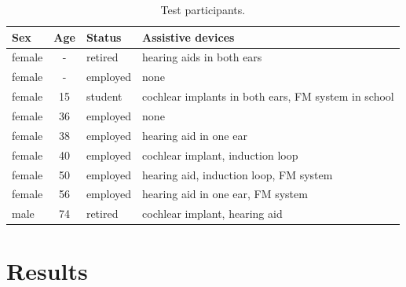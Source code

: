 \documentclass[english, 12pt, a4paper, pdftex, elec, utf8]{aaltothesis}
\begin{document}
\begin{table}[]
	\renewcommand{\arraystretch}{1.2}  %
	\setlength{\tabcolsep}{9pt}                %
	\centering
	\caption{Test participants.}
	\label{table:testsubjects}
	\begin{tabular}{@{}lcll@{}}
		\toprule
		\textbf{Sex} & \textbf{Age} & \textbf{Status} & \textbf{Assistive devices}                          \\ \midrule
		female       & -            & retired         & hearing aids in both ears                           \\ \midrule
		female       & -            & employed        & none                                                \\ \midrule
		female       & 15           & student         & cochlear implants in both ears, FM system in school \\ \midrule
		female       & 36           & employed        & none                                                \\ \midrule
		female       & 38           & employed        & hearing aid in one ear                              \\ \midrule
		female       & 40           & employed        & cochlear implant, induction loop                    \\ \midrule
		female       & 50           & employed        & hearing aid, induction loop, FM system              \\ \midrule
		female       & 56           & employed        & hearing aid in one ear, FM system                   \\ \midrule
		male         & 74           & retired         & cochlear implant, hearing aid                       \\ \bottomrule
	\end{tabular}
\end{table}

\clearpage

\section{Results} \label{sec:results}
\end{document}
